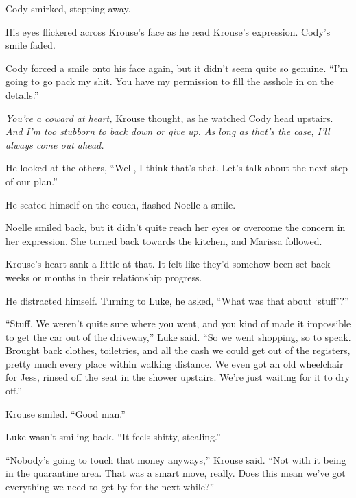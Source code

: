 Cody smirked, stepping away.



His eyes flickered across Krouse's face as he read Krouse's expression.  Cody's smile faded.



Cody forced a smile onto his face again, but it didn't seem quite so genuine.  ``I'm going to go pack my shit.  You have my permission to fill the asshole in on the details.''



\emph{You're a coward at heart, }Krouse thought, as he watched Cody head upstairs.  \emph{And I'm too stubborn to back down or give up.  As long as that's the case, I'll always come out ahead.}



He looked at the others, ``Well, I think that's that.  Let's talk about the next step of our plan.''



He seated himself on the couch, flashed Noelle a smile.



Noelle smiled back, but it didn't quite reach her eyes or overcome the concern in her expression.  She turned back towards the kitchen, and Marissa followed.



Krouse's heart sank a little at that.  It felt like they'd somehow been set back weeks or months in their relationship progress.



He distracted himself.  Turning to Luke, he asked, ``What was that about `stuff'?''



``Stuff.  We weren't quite sure where you went, and you kind of made it impossible to get the car out of the driveway,'' Luke said.  ``So we went shopping, so to speak.  Brought back clothes, toiletries, and all the cash we could get out of the registers, pretty much every place within walking distance.  We even got an old wheelchair for Jess, rinsed off the seat in the shower upstairs.  We're just waiting for it to dry off.''



Krouse smiled.  ``Good man.''



Luke wasn't smiling back.  ``It feels shitty, stealing.''



``Nobody's going to touch that money anyways,'' Krouse said.  ``Not with it being in the quarantine area.  That was a smart move, really.  Does this mean we've got everything we need to get by for the next while?''



